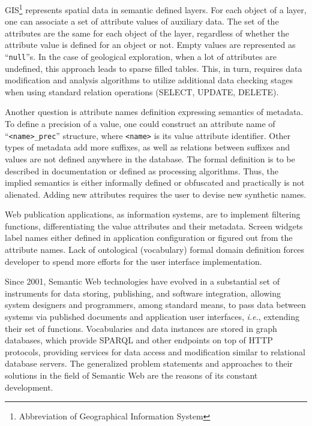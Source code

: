 \documentclass[
]{ceurart}
\begin{document}
GIS\footnote{Abbreviation of Geographical Information System} represents spatial data in semantic defined layers.  For each object of a layer, one can associate a set of attribute values of auxiliary data.  The set of the attributes are the same for each object of the layer, regardless of whether the attribute value is defined for an object or not.  Empty values are represented as ``\texttt{null}''s.  In the case of geological exploration, when a lot of attributes are undefined, this approach leads to sparse filled tables.  This, in turn, requires data modification and analysis algorithms to utilize additional data checking stages when using standard relation operations (SELECT, UPDATE, DELETE).

Another question is attribute names definition expressing semantics of metadata.  To define a precision of a value, one could construct an attribute name of ``\texttt{<name>\_prec}'' structure, where \texttt{<name>} is its value attribute identifier.  Other types of metadata add more suffixes, as well as relations between suffixes and values are not defined anywhere in the database.  The formal definition is to be described in documentation or defined as processing algorithms.  Thus, the implied semantics is either informally defined or obfuscated and practically is not alienated.  Adding new attributes requires the user to devise new synthetic names.

Web publication applications, as information systems, are to implement filtering functions, differentiating the value attributes and their metadata.  Screen widgets label names either defined in application configuration or figured out from the attribute names.  Lack of ontological (vocabulary) formal domain definition forces developer to spend more efforts for the user interface implementation.

Since 2001, Semantic Web technologies have evolved in a substantial set of instruments for data storing, publishing, and software integration, allowing system designers and programmers, among standard means, to pass data between systems via published documents and application user interfaces, \emph{i.e.}, extending their set of functions.  Vocabularies and data instances are stored in graph databases, which provide SPARQL and other endpoints on top of HTTP protocols, providing services for data access and modification similar to relational database servers.  The generalized problem statements and approaches to their solutions in the field of Semantic Web are the reasons of its constant development.
\end{document}
